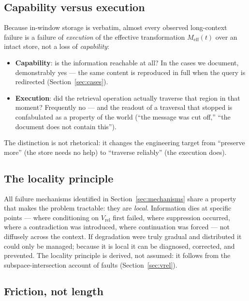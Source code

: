 \documentclass[11pt]{article}
\theoremstyle{remark}
\newcommand{\Vrel}{V_{\mathrm{rel}}}
\newcommand{\Meff}{M_{\mathrm{eff}}}
\begin{document}
\subsection{Capability versus execution}
\label{sec:capexec}

Because in-window storage is verbatim, almost every observed long-context failure is
a failure of \emph{execution} of the effective transformation $\Meff(t)$ over an intact store, not a loss of \emph{capability}:
\begin{itemize}
\item \textbf{Capability}: is the information reachable at all? In the cases we
document, demonstrably yes --- the same content is reproduced in full when the query
is redirected (Section~\ref{sec:cases}).
\item \textbf{Execution}: did the retrieval operation actually traverse that region in
that moment? Frequently no --- and the readout of a traversal that stopped is
confabulated as a property of the world (``the message was cut off,'' ``the document
does not contain this'').
\end{itemize}
The distinction is not rhetorical: it changes the engineering target from ``preserve
more'' (the store needs no help) to ``traverse reliably'' (the execution does).

\subsection{The locality principle}

All failure mechanisms identified in Section~\ref{sec:mechanisms} share a property
that makes the problem tractable: they are \emph{local}. Information dies at specific
points --- where conditioning on $\Vrel$ first failed, where suppression occurred,
where a contradiction was introduced, where continuation was forced --- not diffusely
across the context. If degradation were truly gradual and distributed it could only be
managed; because it is local it can be diagnosed, corrected, and prevented. The
locality principle is derived, not assumed: it follows from the
subspace-intersection account of faults (Section~\ref{sec:vrel}).

\subsection{Friction, not length}
\label{sec:friction}
\end{document}
